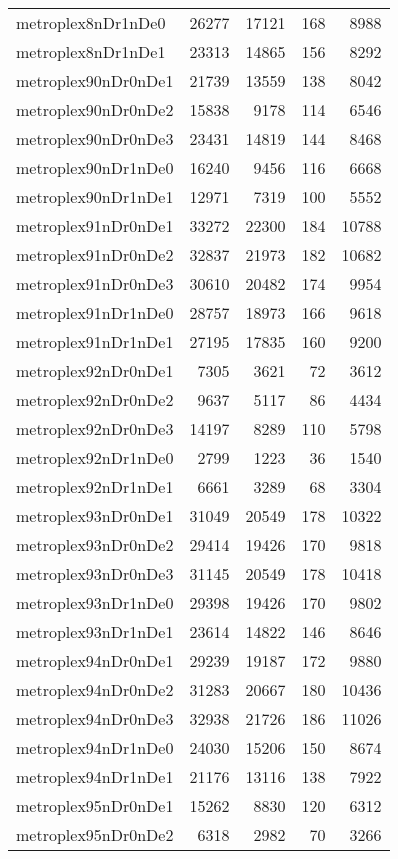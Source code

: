 \begin{longtable}{lrrrr}
metroplex8nDr1nDe0 & 26277 & 17121 & 168 & 8988 \\
metroplex8nDr1nDe1 & 23313 & 14865 & 156 & 8292 \\
metroplex90nDr0nDe1 & 21739 & 13559 & 138 & 8042 \\
metroplex90nDr0nDe2 & 15838 & 9178 & 114 & 6546 \\
metroplex90nDr0nDe3 & 23431 & 14819 & 144 & 8468 \\
metroplex90nDr1nDe0 & 16240 & 9456 & 116 & 6668 \\
metroplex90nDr1nDe1 & 12971 & 7319 & 100 & 5552 \\
metroplex91nDr0nDe1 & 33272 & 22300 & 184 & 10788 \\
metroplex91nDr0nDe2 & 32837 & 21973 & 182 & 10682 \\
metroplex91nDr0nDe3 & 30610 & 20482 & 174 & 9954 \\
metroplex91nDr1nDe0 & 28757 & 18973 & 166 & 9618 \\
metroplex91nDr1nDe1 & 27195 & 17835 & 160 & 9200 \\
metroplex92nDr0nDe1 & 7305 & 3621 & 72 & 3612 \\
metroplex92nDr0nDe2 & 9637 & 5117 & 86 & 4434 \\
metroplex92nDr0nDe3 & 14197 & 8289 & 110 & 5798 \\
metroplex92nDr1nDe0 & 2799 & 1223 & 36 & 1540 \\
metroplex92nDr1nDe1 & 6661 & 3289 & 68 & 3304 \\
metroplex93nDr0nDe1 & 31049 & 20549 & 178 & 10322 \\
metroplex93nDr0nDe2 & 29414 & 19426 & 170 & 9818 \\
metroplex93nDr0nDe3 & 31145 & 20549 & 178 & 10418 \\
metroplex93nDr1nDe0 & 29398 & 19426 & 170 & 9802 \\
metroplex93nDr1nDe1 & 23614 & 14822 & 146 & 8646 \\
metroplex94nDr0nDe1 & 29239 & 19187 & 172 & 9880 \\
metroplex94nDr0nDe2 & 31283 & 20667 & 180 & 10436 \\
metroplex94nDr0nDe3 & 32938 & 21726 & 186 & 11026 \\
metroplex94nDr1nDe0 & 24030 & 15206 & 150 & 8674 \\
metroplex94nDr1nDe1 & 21176 & 13116 & 138 & 7922 \\
metroplex95nDr0nDe1 & 15262 & 8830 & 120 & 6312 \\
metroplex95nDr0nDe2 & 6318 & 2982 & 70 & 3266 \\

\end{longtable}

